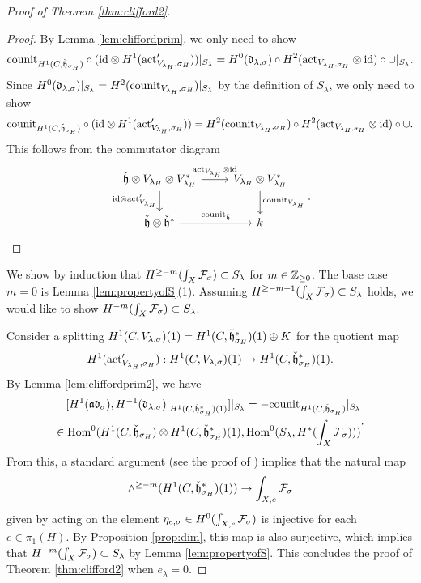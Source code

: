 \documentclass[reqno]{amsart}
\numberwithin{equation}{section}
\numberwithin{equation}{section}
\begin{document}
\begin{proof}[Proof of Theorem \ref{thm:clifford2}]
\begin{proof}
    By Lemma \ref{lem:cliffordprim}, we only need to show \[\mathrm{counit}_{H^1(C,\check{\mathfrak{h}}_{\sigma_H})}\circ (\mathrm{id}\otimes H^1(\mathrm{act}_{V_{\lambda_H},\sigma_H}'))|_{S_{\lambda}} = H^0(\mathfrak{d}_{\lambda,\sigma})\circ H^2(\mathrm{act}_{V_{\lambda_H, \sigma_H}}\otimes\mathrm{id})\circ \cup|_{S_{\lambda}}.\] Since $H^0(\mathfrak{d}_{\lambda,\sigma})|_{S_{\lambda}} = H^2(\mathrm{counit}_{V_{\lambda_H},\sigma_H})|_{S_{\lambda}}$ by the definition of $S_{\lambda}$, we only need to show \[\mathrm{counit}_{H^1(C,\check{\mathfrak{h}}_{\sigma_H})}\circ (\mathrm{id}\otimes H^1(\mathrm{act}_{V_{\lambda_H},\sigma_H}'))= H^2(\mathrm{counit}_{V_{\lambda_H},\sigma_H})\circ H^2(\mathrm{act}_{V_{\lambda_H, \sigma_H}}\otimes\mathrm{id})\circ \cup .\] This follows from the commutator diagram 
    \[\begin{tikzcd}
        \frhc\otimes V_{\lambda_H}\otimes V_{\lambda_H}^* \arrow[r, "\act_{V_{\lambda_H}}\otimes\id"] \arrow[d, "\id\otimes\act_{V_{\lambda_H}}'"'] & V_{\lambda_H}\otimes V_{\lambda_H}^* \ar[d, "\counit_{V_{\lambda_H}}"]  \\
        \frhc\otimes \frhc^* \arrow[r, "\counit_{\frhc}"] &  k
    \end{tikzcd}.\]

\end{proof}


We show by induction that $H^{\geq -m}(\int_X\mathcal{F}_{\sigma})\subset S_{\lambda}$ for $m\in \mathbb{Z}_{\geq 0}$. The base case $m=0$ is Lemma \ref{lem:propertyofS}(1). Assuming $H^{\geq -m+1}(\int_X\mathcal{F}_{\sigma})\subset S_{\lambda}$ holds, we would like to show $H^{-m}(\int_X\mathcal{F}_{\sigma})\subset S_{\lambda}$.

Consider a splitting $H^1(C,V_{\lambda,\sigma})(1)=H^1(C,\check{\mathfrak{h}}_{\sigma_H}^*)(1)\oplus K$ for the quotient map \[H^1(\mathrm{act}_{V_{\lambda_H},\sigma_H}'):H^1(C,V_{\lambda,\sigma})(1)\to H^1(C,\check{\mathfrak{h}}_{\sigma_H}^*)(1).\] By Lemma \ref{lem:cliffordprim2}, we have \[\begin{split}[H^1(\mathfrak{a}\mathfrak{d}_{\sigma}),H^{-1}(\mathfrak{d}_{\lambda,\sigma})|_{H^1(C,\check{\mathfrak{h}}_{\sigma_H}^*)(1)}]|_{S_{\lambda}}=-\mathrm{counit}_{H^1(C,\check{\mathfrak{h}}_{\sigma_H})}|_{S_{\lambda}} \\ \in \operatorname{Hom}^0( H^1(C,\check{\mathfrak{h}}_{\sigma_H})\otimes H^1(C,\check{\mathfrak{h}}_{\sigma_H}^*)(1), \operatorname{Hom}^0(S_{\lambda},H^*(\int_{X}\mathcal{F}_{\sigma})))\end{split}.\] From this, a standard argument (see the proof of \cite[Lemma\,6.16]{wang2025specialcycleshtukascategorical}) implies that the natural map \[\wedge^{\geq -m}(H^1(C,\check{\mathfrak{h}}_{\sigma_H}^*)(1))\to \int_{X,e}\mathcal{F}_{\sigma}\] given by acting on the element $\eta_{e,\sigma}\in H^0(\int_{X,e}\mathcal{F}_{\sigma})$ is injective for each $e\in \pi_1(H)$. By Proposition \ref{prop:dim}, this map is also surjective, which implies that $H^{-m}(\int_{X}\mathcal{F}_{\sigma})\subset S_{\lambda}$ by Lemma \ref{lem:propertyofS}. This concludes the proof of Theorem \ref{thm:clifford2} when $e_{\lambda}=0$.
\end{proof}
\end{document}
